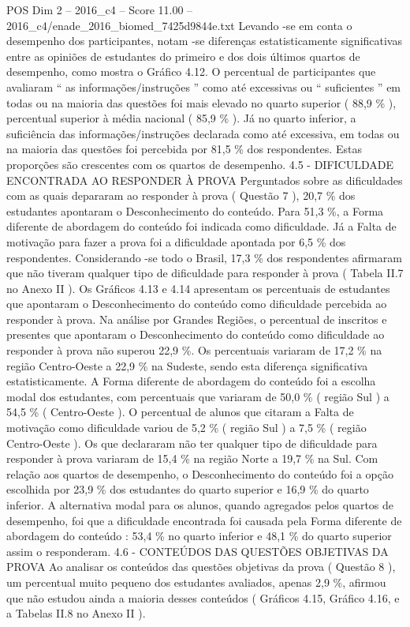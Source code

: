 \begin{textsample}{POS Dim 2 – 2016\_c4 – Score 11.00 – 2016\_c4/enade\_2016\_biomed\_7425d9844e.txt}
Levando -se em conta o desempenho dos participantes, notam -se diferenças estatisticamente significativas entre as opiniões de estudantes do primeiro e dos dois últimos quartos de desempenho, como mostra o Gráfico 4.12.
O percentual de participantes que avaliaram “ as informações/instruções ” como até excessivas ou “ suficientes ” em todas ou na maioria das questões foi mais elevado no quarto superior ( 88,9 \% ), percentual superior à média nacional ( 85,9 \% ).
Já no quarto inferior, a suficiência das informações/instruções declarada como até excessiva, em todas ou na maioria das questões foi percebida por 81,5 \% dos respondentes.
Estas proporções são crescentes com os quartos de desempenho. 4.5 - DIFICULDADE ENCONTRADA AO RESPONDER À PROVA Perguntados sobre as dificuldades com as quais depararam ao responder à prova ( Questão 7 ), 20,7 \% dos estudantes apontaram o Desconhecimento do conteúdo.
Para 51,3 \%, a Forma diferente de abordagem do conteúdo foi indicada como dificuldade.
Já a Falta de motivação para fazer a prova foi a dificuldade apontada por 6,5 \% dos respondentes.
Considerando -se todo o Brasil, 17,3 \% dos respondentes afirmaram que não tiveram qualquer tipo de dificuldade para responder à prova ( Tabela II.7 no Anexo II ).
Os Gráficos 4.13 e 4.14 apresentam os percentuais de estudantes que apontaram o Desconhecimento do conteúdo como dificuldade percebida ao responder à prova.
Na análise por Grandes Regiões, o percentual de inscritos e presentes que apontaram o Desconhecimento do conteúdo como dificuldade ao responder à prova não superou 22,9 \%.
Os percentuais variaram de 17,2 \% na região Centro-Oeste a 22,9 \% na Sudeste, sendo esta diferença significativa estatisticamente.
A Forma diferente de abordagem do conteúdo foi a escolha modal dos estudantes, com percentuais que variaram de 50,0 \% ( região Sul ) a 54,5 \% ( Centro-Oeste ).
O percentual de alunos que citaram a Falta de motivação como dificuldade variou de 5,2 \% ( região Sul ) a 7,5 \% ( região Centro-Oeste ).
Os que declararam não ter qualquer tipo de dificuldade para responder à prova variaram de 15,4 \% na região Norte a 19,7 \% na Sul.
Com relação aos quartos de desempenho, o Desconhecimento do conteúdo foi a opção escolhida por 23,9 \% dos estudantes do quarto superior e 16,9 \% do quarto inferior.
A alternativa modal para os alunos, quando agregados pelos quartos de desempenho, foi que a dificuldade encontrada foi causada pela Forma diferente de abordagem do conteúdo : 53,4 \% no quarto inferior e 48,1 \% do quarto superior assim o responderam. 4.6 - CONTEÚDOS DAS QUESTÕES OBJETIVAS DA PROVA Ao analisar os conteúdos das questões objetivas da prova ( Questão 8 ), um percentual muito pequeno dos estudantes avaliados, apenas 2,9 \%, afirmou que não estudou ainda a maioria desses conteúdos ( Gráficos 4.15, Gráfico 4.16, e a Tabelas II.8 no Anexo II ).

\end{textsample}
